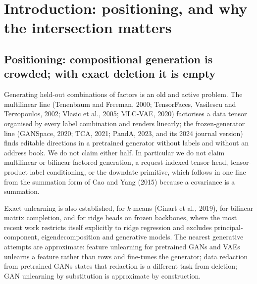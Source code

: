 \documentclass{article}
\begin{document}
\section{Introduction: positioning, and why the intersection matters}
\label{sec:intro}

\subsection{Positioning: compositional generation is crowded; with exact deletion it is empty}
\label{sec:positioning}

Generating held-out combinations of factors is an old and active problem. The multilinear
line (Tenenbaum and Freeman, 2000; TensorFaces, Vasilescu and Terzopoulos, 2002; Vlasic et
al., 2005; MLC-VAE, 2020) factorises a data tensor organised by every label combination and
renders linearly; the frozen-generator line (GANSpace, 2020; TCA, 2021; PandA, 2023, and its
2024 journal version) finds editable directions in a pretrained generator without labels and
without an address book. We do not claim either half. In particular we do not claim
multilinear or bilinear factored generation, a request-indexed tensor head, tensor-product
label conditioning, or the downdate primitive, which follows in one line from the summation
form of Cao and Yang (2015) because a covariance is a summation.

Exact unlearning is also established, for $k$-means (Ginart et al., 2019), for bilinear
matrix completion, and for ridge heads on frozen backbones, where the most recent work
restricts itself explicitly to ridge regression and excludes principal-component,
eigendecomposition and generative models. The nearest generative attempts are approximate:
feature unlearning for pretrained GANs and VAEs unlearns a feature rather than rows and
fine-tunes the generator; data redaction from pretrained GANs states that redaction is a
different task from deletion; GAN unlearning by substitution is approximate by construction.
\end{document}
